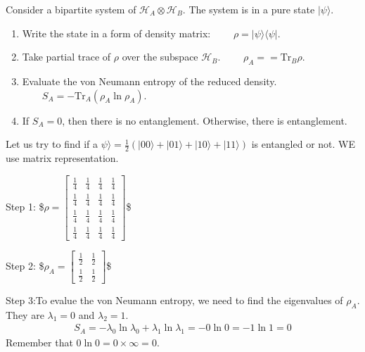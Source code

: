 \documentclass[letterpaper,10pt,english]{jupyterBook}
\begin{document}
\sphinxAtStartPar
Consider a bipartite system of \(\mathcal{H}_A \otimes \mathcal{H}_B\). The system is in a pure state \(|\psi\rangle\).
\begin{enumerate}
%
\item {}
\sphinxAtStartPar
Write the state in a form of density matrix:  \(\qquad \rho = |\psi\rangle\langle \psi |\).

\item {}
\sphinxAtStartPar
Take partial trace of \(\rho\) over the subspace \(\mathcal{H}_B\).   \(\qquad \rho_A = = \text{Tr}_B \rho\).

\item {}
\sphinxAtStartPar
Evaluate the von Neumann entropy of the reduced density.  \(\qquad S_A = - \text{Tr}_A \left( \rho_A \ln \rho_A\right)\).

\item {}
\sphinxAtStartPar
If \(S_A=0\), then there is no entanglement.  Otherwise, there is entanglement.

\end{enumerate}

\sphinxAtStartPar
{}

\sphinxAtStartPar
Let us try to find if a \(\psi\rangle = \frac{1}{2}\left(|00\rangle + |01\rangle + |10\rangle + |11\rangle \right)\) is entangled or not. WE use matrix representation.

\sphinxAtStartPar
Step 1:
\$\(
\rho = \begin{bmatrix} \frac{1}{4} & \frac{1}{4} & \frac{1}{4} & \frac{1}{4} \\ \frac{1}{4} & \frac{1}{4} & \frac{1}{4} & \frac{1}{4} \\ \frac{1}{4} & \frac{1}{4} & \frac{1}{4} & \frac{1}{4} \\ \frac{1}{4} & \frac{1}{4} & \frac{1}{4} & \frac{1}{4} \end{bmatrix}
\)\$

\sphinxAtStartPar
Step 2:
\$\(
\rho_A = \begin{bmatrix} \frac{1}{2} & \frac{1}{2} \\ \frac{1}{2} & \frac{1}{2} \end{bmatrix}
\)\$

\sphinxAtStartPar
Step 3:To evalue the von Neumann entropy, we need to find the eigenvalues of \(\rho_A\).  They are \(\lambda_1 = 0\) and \(\lambda_2=1\).
\begin{equation*}
\begin{split}
S_A = - \lambda_0 \ln \lambda_0 + \lambda_1 \ln \lambda_1 = - 0 \ln 0 = -1 \ln 1 = 0
\end{split}
\end{equation*}
\sphinxAtStartPar
Remember that \(0 \ln 0 = 0 \times \infty = 0\).
\end{document}
